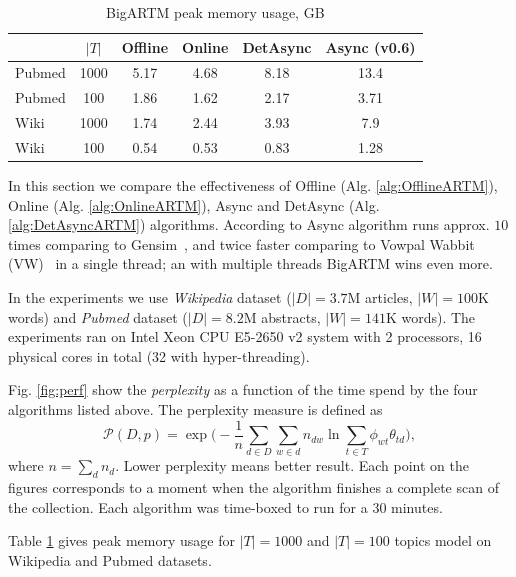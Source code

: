 \documentclass[russian,english]{llncs}
\newcommand{\kw}[1]{\mbox{\textsf{#1}}}
\begin{document}
\begin{table}[t]
	\caption{
		BigARTM peak memory usage, GB
	}
	\label{tab:memory}
	\centering\tabcolsep=4.3pt
	\begin{tabular}[t]{|l|ccccc|}
		\hline
		& $|T|$ & Offline   & Online    & DetAsync     & Async (\kw{v0.6})  \\
		\hline
		Pubmed & {1000}	& {5.17}   	& {4.68}   	& {8.18}   	& {13.4}      \\
		Pubmed & {100}	& {1.86}   	& {1.62}   	& {2.17}   	& {3.71}      \\
		Wiki   & {1000}	& {1.74}   	& {2.44}   	& {3.93}   	& {7.9}       \\ 
		Wiki   & {100}	& {0.54}   	& {0.53}   	& {0.83}   	& {1.28}       \\ 
		\hline
	\end{tabular}
\end{table}

In this section we compare the effectiveness of
\kw{Offline} (Alg. \ref{alg:OfflineARTM}),
\kw{Online} (Alg. \ref{alg:OnlineARTM}),
\kw{Async} \cite{vfardi15aist} and
\kw{DetAsync} (Alg. \ref{alg:DetAsyncARTM}) algorithms.
According to \cite{vfardi15aist} \kw{Async} algorithm
runs approx. $10$ times comparing to Gensim~\cite{rehurek10software},
and twice faster comparing to 
Vowpal Wabbit (VW)~\cite{langford07vw}
in a single thread;
an with multiple threads BigARTM wins even more.

In the experiments we use \emph{Wikipedia} dataset ($|D| = 3.7$M articles, $|W| = 100$K words)
and \emph{Pubmed} dataset ($|D| = 8.2$M abstracts, $|W| = 141$K words).
The experiments ran on Intel Xeon CPU E5-2650 v2 system with 2 processors, 16 physical cores in total (32 with hyper-threading).


Fig. \ref{fig:perf} show the \emph{perplexity} as a function of the time spend by the four algorithms listed above.
The perplexity measure is defined as
\begin{equation}
\label{eq:perplexity}
\mathscr{P}(D, p) =
\exp \biggl( - \frac{1}{n} \sum_{d \in D} \sum_{w \in d} n_{dw} \ln \sum_{t\in T} \phi_{wt} \theta_{td} \biggr),
\end{equation}
 where $n = \sum_d n_d$. Lower perplexity means better result.
Each point on the figures corresponds to a moment when the algorithm finishes a complete scan of the collection.
Each algorithm was time-boxed to run for a 30 minutes.

Table \ref{tab:memory} gives peak memory usage for $|T| = 1000$ and $|T|=100$ topics model on Wikipedia and Pubmed datasets.
\end{document}
